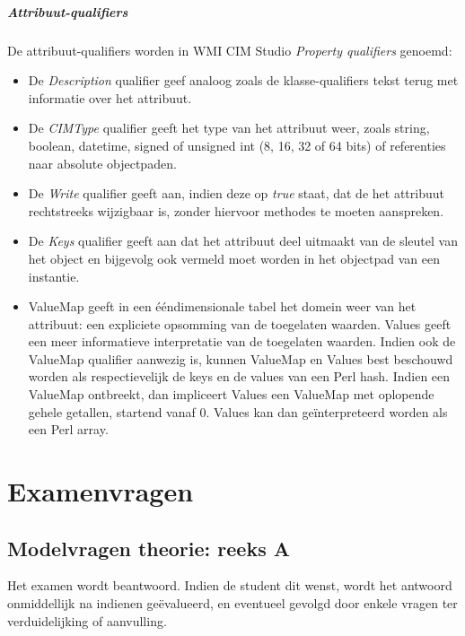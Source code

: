 \documentclass{report}
\begin{document}
	\subsubsection{Attribuut-qualifiers}
	De attribuut-qualifiers worden in WMI CIM Studio \textit{Property qualifiers} genoemd:
	\begin{itemize}
		\item De \textit{Description} qualifier geef analoog zoals de klasse-qualifiers tekst terug met informatie over het attribuut.
		\item De \textit{CIMType} qualifier geeft het type van het attribuut weer, zoals string, boolean, datetime, signed of unsigned int (8, 16, 32 of 64 bits) of referenties naar absolute objectpaden.
		\item De \textit{Write} qualifier geeft aan, indien deze op \textit{true} staat, dat de het attribuut rechtstreeks wijzigbaar is, zonder hiervoor methodes te moeten aanspreken. 
		\item De \textit{Keys} qualifier geeft aan dat het attribuut deel uitmaakt van de sleutel van het object en bijgevolg ook vermeld moet worden in het objectpad van een instantie.
		\item ValueMap geeft in een ééndimensionale tabel het domein weer van het attribuut: een expliciete opsomming van de toegelaten waarden.
			  Values geeft een meer informatieve interpretatie van de toegelaten waarden. Indien ook de ValueMap qualifier aanwezig is, kunnen ValueMap en Values best beschouwd worden als respectievelijk de keys en de values van een Perl hash. Indien een ValueMap ontbreekt, dan impliceert Values een ValueMap met oplopende gehele getallen, startend vanaf 0. Values kan dan geïnterpreteerd worden als een Perl array.
	\end{itemize}
	\part{Examenvragen}
	\chapter{Modelvragen theorie: reeks A}
	Het examen wordt  beantwoord. Indien de student dit wenst, wordt het antwoord onmiddellijk na indienen geëvalueerd, en eventueel gevolgd door enkele vragen ter verduidelijking of aanvulling.
	
\end{document}
